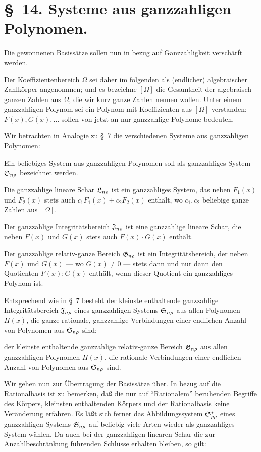 \section*{\S\ 14. Systeme aus ganzzahligen Polynomen.}

Die gewonnenen Basissätze sollen nun in bezug auf Ganzzahligkeit verschärft werden.

Der Koeffizientenbereich $\Omega$ sei daher im folgenden als (endlicher) algebraischer Zahlkörper angenommen; und es bezeichne $[\Omega]$ die Gesamtheit der algebraisch-ganzen Zahlen aus $\Omega$, die wir kurz ganze Zahlen nennen wollen. Unter einem ganzzahligen Polynom sei ein Polynom mit Koeffizienten aus $[\Omega]$ verstanden; $F(x),G(x),\ldots$ sollen von jetzt an nur ganzzahlige Polynome bedeuten.

Wir betrachten in Analogie zu \S\ 7 die verschiedenen Systeme aus ganzzahligen Polynomen:

Ein beliebiges System aus ganzzahligen Polynomen soll als ganzzahliges System $\mathfrak{S}_{n\rho}$ bezeichnet werden.

Die ganzzahlige lineare Schar $\mathfrak{L}_{n\rho}$ ist ein ganzzahliges System, das neben $F_1(x)$ und $F_2(x)$ stets auch $c_1F_1(x)+c_2F_2(x)$ enthält, wo $c_1,c_2$ beliebige ganze Zahlen aus $[\Omega]$.

Der ganzzahlige Integritätsbereich $\mathfrak{J}_{n\rho}$ ist eine ganzzahlige lineare Schar, die neben $F(x)$ und $G(x)$ stets auch $F(x)\cdot G(x)$ enthält.

Der ganzzahlige relativ-ganze Bereich $\mathfrak{G}_{n\rho}$ ist ein Integritätsbereich, der neben $F(x)$ und $G(x)$ --- wo $G(x)\ne0$ --- stets dann und nur dann den Quotienten $F(x):G(x)$ enthält, wenn dieser Quotient ein ganzzahliges Polynom ist.

Entsprechend wie in \S\ 7 besteht der kleinste enthaltende ganzzahlige Integritätsbereich $\mathfrak{J}_{n\rho}$ eines ganzzahligen Systems $\mathfrak{S}_{n\rho}$ aus allen Polynomen $H(x)$, die ganze rationale, ganzzahlige Verbindungen einer endlichen Anzahl von Polynomen aus $\mathfrak{S}_{n\rho}$ sind;

der kleinste enthaltende ganzzahlige relativ-ganze Bereich $\mathfrak{G}_{n\rho}$ aus allen ganzzahligen Polynomen $H(x)$, die rationale Verbindungen einer endlichen Anzahl von Polynomen aus $\mathfrak{S}_{n\rho}$ sind.

Wir gehen nun zur Übertragung der Basissätze über. In bezug auf die Rationalbasis ist zu bemerken, daß die nur auf ``Rationalem'' beruhenden Begriffe des Körpers, kleinsten enthaltenden Körpers und der Rationalbasis keine Veränderung erfahren. Es läßt sich ferner das Abbildungssystem $\mathfrak{S}^*_{\rho\rho}$ eines ganzzahligen Systems $\mathfrak{S}_{n\rho}$ auf beliebig viele Arten wieder als ganzzahliges System wählen. Da auch bei der ganzzahligen linearen Schar die zur Anzahlbeschränkung führenden Schlüsse erhalten bleiben, so gilt:

